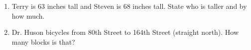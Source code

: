 \begin{enumerate}
\item Terry is 63 inches tall and Steven is 68 inches tall. State who is taller and by how much.  \vspace{3cm}

\item Dr. Huson bicycles from 80th Street to 164th Street (straight north). How many blocks is that?

\end{enumerate}
